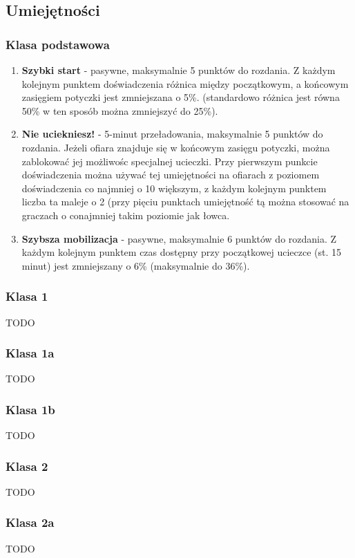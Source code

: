 \documentclass[a4paper,11pt,notitlepage]{article}
\begin{document}
\subsection{Umiejętności}
\subsubsection{Klasa podstawowa}
\begin{enumerate}
\item \textbf{Szybki start} - pasywne, maksymalnie 5 punktów do rozdania. Z każdym kolejnym punktem doświadczenia różnica między początkowym, a końcowym zasięgiem potyczki jest zmniejszana o 5\%. (standardowo różnica jest równa 50\% w ten sposób można zmniejszyć do 25\%).

\item \textbf{Nie uciekniesz!} - 5-minut przeładowania, maksymalnie 5 punktów do rozdania. Jeżeli ofiara znajduje się w końcowym zasięgu potyczki, można zablokować jej możliwośc specjalnej ucieczki. Przy pierwszym punkcie doświadczenia można używać tej umiejętności na ofiarach z poziomem doświadczenia co najmniej o 10 większym, z każdym kolejnym punktem liczba ta maleje o 2 (przy pięciu punktach umiejętność tą można stosować na graczach o conajmniej takim poziomie jak łowca.

\item \textbf{Szybsza mobilizacja} - pasywne, maksymalnie 6 punktów do rozdania. Z każdym kolejnym punktem czas dostępny przy początkowej ucieczce (st. 15 minut) jest zmniejszany o 6\% (maksymalnie do 36\%).
\end{enumerate}

\subsubsection{Klasa 1}
TODO
\subsubsection{Klasa 1a}
TODO
\subsubsection{Klasa 1b}
TODO

\subsubsection{Klasa 2}
TODO
\subsubsection{Klasa 2a}
TODO
\end{document}
